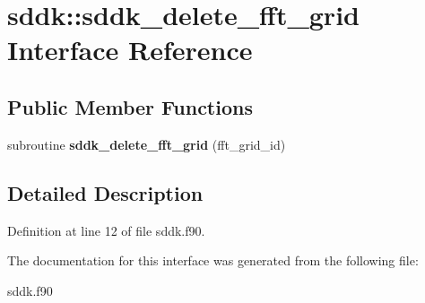 \hypertarget{interfacesddk_1_1sddk__delete__fft__grid}{}\section{sddk\+:\+:sddk\+\_\+delete\+\_\+fft\+\_\+grid Interface Reference}
\label{interfacesddk_1_1sddk__delete__fft__grid}
\subsection*{Public Member Functions}
\begin{DoxyCompactItemize}
\item 
\hypertarget{interfacesddk_1_1sddk__delete__fft__grid_a0539f79007ba9073be9b783fa46faa9e}{}subroutine {\bfseries sddk\+\_\+delete\+\_\+fft\+\_\+grid} (fft\+\_\+grid\+\_\+id)\label{interfacesddk_1_1sddk__delete__fft__grid_a0539f79007ba9073be9b783fa46faa9e}

\end{DoxyCompactItemize}


\subsection{Detailed Description}


Definition at line 12 of file sddk.\+f90.



The documentation for this interface was generated from the following file\+:\begin{DoxyCompactItemize}
\item 
sddk.\+f90\end{DoxyCompactItemize}

